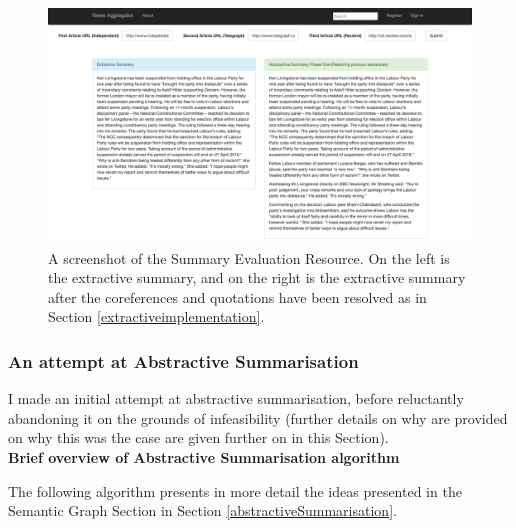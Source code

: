 \documentclass[12pt]{article}
\begin{document}
\begin{figure}[ht!]
  \centering
    \includegraphics[scale=0.3]{SummaryEvaluationResource}
   \caption[A screenshot of the Summary Evaluation Resource]{A screenshot of the Summary Evaluation Resource. On the left is the extractive summary, and on the right is the extractive summary after the coreferences and quotations have been resolved as in Section \ref{extractiveimplementation}.}
   \label{summaryevaluationresource}
\end{figure} 

\subsubsection{An attempt at Abstractive Summarisation}

\label{abstractiveimplementation}

I made an initial attempt at abstractive summarisation, before reluctantly abandoning it on the grounds of infeasibility (further details on why are provided on why this was the case are given further on in this Section). \\

\textbf{Brief overview of Abstractive Summarisation algorithm}

The following algorithm presents in more detail the ideas presented in the Semantic Graph Section in Section \ref{abstractiveSummarisation}. \\
\end{document}
